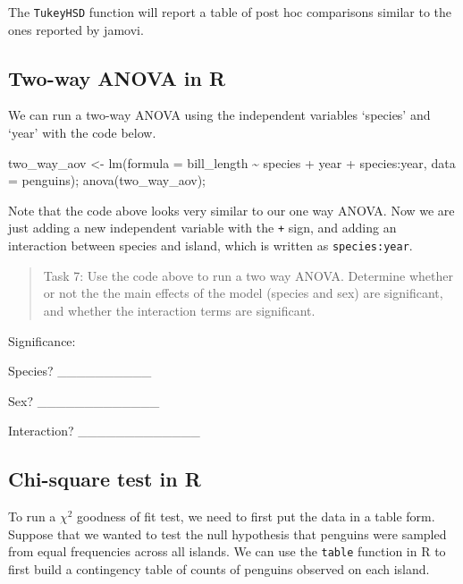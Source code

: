 \documentclass[
]{scrbook}
\newenvironment{Shaded}{\begin{snugshade}}{\end{snugshade}}
\newcommand{\AttributeTok}[1]{\textcolor[rgb]{0.77,0.63,0.00}{#1}}
\newcommand{\FunctionTok}[1]{\textcolor[rgb]{0.00,0.00,0.00}{#1}}
\newcommand{\NormalTok}[1]{#1}
\newcommand{\OtherTok}[1]{\textcolor[rgb]{0.56,0.35,0.01}{#1}}
\newcommand{\SpecialCharTok}[1]{\textcolor[rgb]{0.00,0.00,0.00}{#1}}
\begin{document}
The \texttt{TukeyHSD} function will report a table of post hoc comparisons similar to the ones reported by jamovi.

\hypertarget{two-way-anova-in-r}{%
\subsection{Two-way ANOVA in R}\label{two-way-anova-in-r}}

We can run a two-way ANOVA using the independent variables `species' and `year' with the code below.

\begin{Shaded}
\begin{Highlighting}[]
\NormalTok{two\_way\_aov }\OtherTok{\textless{}{-}} \FunctionTok{lm}\NormalTok{(}\AttributeTok{formula =}\NormalTok{  bill\_length }\SpecialCharTok{\textasciitilde{}}\NormalTok{ species }\SpecialCharTok{+}\NormalTok{ year }\SpecialCharTok{+}\NormalTok{ species}\SpecialCharTok{:}\NormalTok{year, }
                  \AttributeTok{data =}\NormalTok{ penguins);}
\FunctionTok{anova}\NormalTok{(two\_way\_aov);}
\end{Highlighting}
\end{Shaded}

Note that the code above looks very similar to our one way ANOVA.
Now we are just adding a new independent variable with the \texttt{+} sign, and adding an interaction between species and island, which is written as \texttt{species:year}.

\begin{quote}
Task 7: Use the code above to run a two way ANOVA. Determine whether or not the the main effects of the model (species and sex) are significant, and whether the interaction terms are significant.
\end{quote}

Significance:

Species? \_\_\_\_\_\_\_\_\_\_

Sex? \_\_\_\_\_\_\_\_\_\_\_\_\_

Interaction? \_\_\_\_\_\_\_\_\_\_\_\_\_

\hypertarget{chi-square-test-in-r}{%
\subsection{Chi-square test in R}\label{chi-square-test-in-r}}

To run a \(\chi^{2}\) goodness of fit test, we need to first put the data in a table form.
Suppose that we wanted to test the null hypothesis that penguins were sampled from equal frequencies across all islands.
We can use the \texttt{table} function in R to first build a contingency table of counts of penguins observed on each island.
\end{document}
